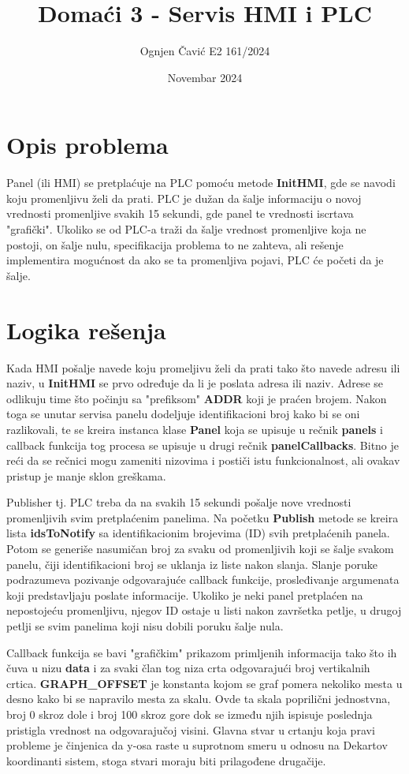 \documentclass[11pt]{article}
\title{Domaći 3 - Servis HMI i PLC}
\author{Ognjen Čavić E2 161/2024}
\date{Novembar 2024}
\begin{document}
\maketitle
\section{Opis problema}
Panel (ili HMI) se pretplaćuje na PLC pomoću metode \textbf{InitHMI}, gde se
navodi koju promenljivu želi da prati.
PLC je dužan da šalje informaciju o novoj vrednosti promenljive svakih 15
sekundi, gde panel te vrednosti iscrtava "grafički".
Ukoliko se od PLC-a traži da šalje vrednost promenljive koja ne postoji, on
šalje nulu, specifikacija problema to ne zahteva, ali rešenje implementira
mogućnost da ako se ta promenljiva pojavi, PLC će početi da je šalje.
\section{Logika rešenja}
Kada HMI pošalje navede koju promeljivu želi da prati tako što navede adresu
ili naziv, u \textbf{InitHMI} se prvo određuje da li je poslata adresa ili 
naziv.
Adrese se odlikuju time što počinju sa "prefiksom" \textbf{ADDR} koji je praćen
brojem.
Nakon toga se unutar servisa panelu dodeljuje identifikacioni broj kako bi se
oni razlikovali, te se kreira instanca klase \textbf{Panel} koja se upisuje
u rečnik \textbf{panels} i callback funkcija tog procesa se upisuje u drugi
rečnik \textbf{panelCallbacks}.
Bitno je reći da se rečnici mogu zameniti nizovima i postiči istu funkcionalnost,
ali ovakav pristup je manje sklon greškama.
\par Publisher tj. PLC treba da na svakih 15 sekundi pošalje nove vrednosti
promenljivih svim pretplaćenim panelima.
Na početku \textbf{Publish} metode se kreira lista \textbf{idsToNotify} sa
identifikacionim brojevima (ID) svih pretplaćenih panela.
Potom se generiše nasumičan broj za svaku od promenljivih koji se šalje svakom
panelu, čiji identifikacioni broj se uklanja iz liste nakon slanja.
Slanje poruke podrazumeva pozivanje odgovarajuće callback funkcije, prosleđivanje
argumenata koji predstavljaju poslate informacije.
Ukoliko je neki panel pretplaćen na nepostojeću promenljivu, njegov ID ostaje
u listi nakon završetka petlje, u drugoj petlji se svim panelima koji nisu 
dobili poruku šalje nula.
\par Callback funkcija se bavi "grafičkim" prikazom primljenih informacija tako
što ih čuva u nizu \textbf{data} i za svaki član tog niza crta odgovarajući broj
vertikalnih crtica.
\textbf{GRAPH\_OFFSET} je konstanta kojom se graf pomera nekoliko mesta u desno
kako bi se napravilo mesta za skalu.
Ovde ta skala poprilični jednostvna, broj 0 skroz dole i broj 100 skroz
gore dok se između njih ispisuje poslednja pristigla vrednost na odgovarajučoj
visini.
Glavna stvar u crtanju koja pravi probleme je činjenica da y-osa raste u
suprotnom smeru u odnosu na Dekartov koordinanti sistem, stoga stvari moraju
biti prilagođene drugačije. 
\end{document}
